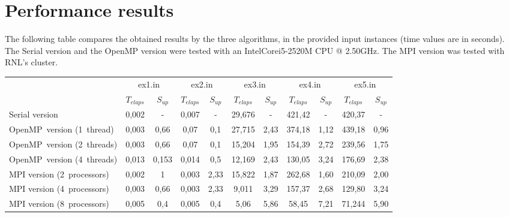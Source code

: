 \documentclass[paper=a4, fontsize=11pt]{scrartcl} %
\numberwithin{equation}{section} %
\numberwithin{figure}{section} %
\numberwithin{table}{section} %
\begin{document}
\section{Performance results}
The following table compares the obtained results by the three algorithms, in the provided input instances (time values are in seconds).
The Serial version and the OpenMP version were tested with an Intel\textregistered Core\texttrademark i5-2520M CPU @ 2.50GHz.
The MPI version was tested with RNL's cluster.
\begin{center}
\begin{tabular}{|m{2.5cm}|c|c|c|c|c|c|c|c|c|c|}
	\cline{2-11}
	\multicolumn{1}{c|}{} & \multicolumn{2}{c|}{ex1.in} & \multicolumn{2}{c|}{ex2.in} & \multicolumn{2}{c|}{ex3.in} & \multicolumn{2}{c|}{ex4.in} & \multicolumn{2}{c|}{ex5.in} \\
	\cline{2-11}
	\multicolumn{1}{c|}{} & $T_{elaps}$ & $S_{up}$ \cellcolor{gray!25} & $T_{elaps}$ & $S_{up}$ \cellcolor{gray!25} & $T_{elaps}$ & $S_{up}$ \cellcolor{gray!25} & $T_{elaps}$ & $S_{up}$ \cellcolor{gray!25} & $T_{elaps}$ & $S_{up}$ \cellcolor{gray!25} \\
	\hline
	Serial version & 0,002 & - \cellcolor{gray!25} & 0,007 & - \cellcolor{gray!25} & 29,676 & - \cellcolor{gray!25} & 421,42 & - \cellcolor{gray!25} & 420,37 & - \cellcolor{gray!25} \\
	\hline
	\nohyphens{OpenMP~version \small{(1~thread)}} & 0,003 & 0,66 \cellcolor{gray!25} & 0,07 & 0,1 \cellcolor{gray!25} & 27,715 & 2,43 \cellcolor{gray!25} & 374,18 & 1,12 \cellcolor{gray!25} & 439,18 & 0,96 \cellcolor{gray!25}\\
	\hline
	\nohyphens{OpenMP~version \small{(2~threads)}} & 0,003 & 0,66  \cellcolor{gray!25}& 0,07 & 0,1 \cellcolor{gray!25} & 15,204 & 1,95 \cellcolor{gray!25} & 154,39 & 2,72 \cellcolor{gray!25} & 239,56 & 1,75 \cellcolor{gray!25}\\
	\hline
	\nohyphens{OpenMP~version \small{(4~threads)}} & 0,013 & 0,153 \cellcolor{gray!25} & 0,014 & 0,5 \cellcolor{gray!25} & 12,169 & 2,43 \cellcolor{gray!25} & 130,05 & 3,24 \cellcolor{gray!25} & 176,69 & 2,38 \cellcolor{gray!25}\\
	\hline
	\nohyphens{MPI version \small{(2~processors)}} & 0,002 & 1 \cellcolor{gray!25} & 0,003 & 2,33 \cellcolor{gray!25} & 15,822 & 1,87 \cellcolor{gray!25} & 262,68 & 1,60 \cellcolor{gray!25} & 210,09 & 2,00 \cellcolor{gray!25}\\
	\hline
	\nohyphens{MPI version \small{(4~processors)}} & 0,003 & 0,66 \cellcolor{gray!25} & 0,003 & 2,33 \cellcolor{gray!25} & 9,011 & 3,29 \cellcolor{gray!25} & 157,37 & 2,68 \cellcolor{gray!25} & 129,80 & 3,24 \cellcolor{gray!25}\\
	\hline
	\nohyphens{MPI version \small{(8~processors)}} & 0,005 & 0,4 \cellcolor{gray!25} & 0,005 & 0,4 \cellcolor{gray!25} & 5,06 & 5,86 \cellcolor{gray!25} & 58,45 & 7,21
\cellcolor{gray!25} & 71,244 & 5,90 \cellcolor{gray!25}\\
	\hline

\end{tabular}
\end{center}
\end{document}
